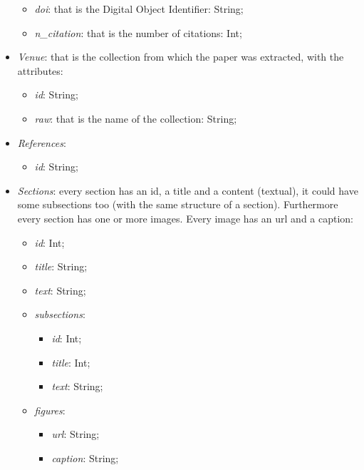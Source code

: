 \documentclass{Configuration_Files/PoliMi3i_thesis}
\begin{document}
\begin{itemize}
\begin{itemize}
               \item  \textit{doi}: that is the Digital Object Identifier: String;
              \item \textit{n\_citation}: that is the number of citations: Int;
            \end{itemize}
        \item \textit{Venue}: that is the collection from which the paper was extracted, with the attributes:
            \begin{itemize}
                \item \textit{id}: String;
                \item \textit{raw}: that is the name of the collection: String;
            \end{itemize}
        \item \textit{References}:
            \begin{itemize}
                \item \textit{id}: String;
            \end{itemize}
        \item \textit{Sections}: every section has an id, a title and a content (textual), it could have some subsections too (with the same structure of a section). Furthermore every section has one or more images. Every image has an url and a caption:
            \begin{itemize}
                \item \textit{id}: Int;
                \item \textit{title}: String;
                \item \textit{text}: String;
                \item \textit{subsections}:
                    \begin{itemize}
                        \item \textit{id}: Int;
                        \item \textit{title}: Int;
                        \item \textit{text}: String;
                    \end{itemize}
                \item \textit{figures}:
                    \begin{itemize}
                        \item \textit{url}: String;
                        \item \textit{caption}: String;
                    \end{itemize}
            \end{itemize}
            
        \end{itemize}
\end{document}
